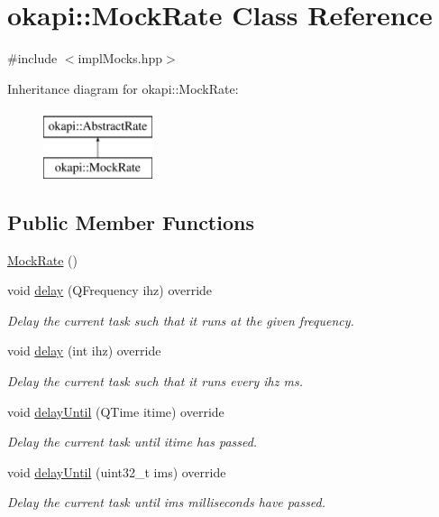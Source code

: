 \hypertarget{classokapi_1_1MockRate}{}\section{okapi\+::Mock\+Rate Class Reference}
\label{classokapi_1_1MockRate}


{\ttfamily \#include $<$impl\+Mocks.\+hpp$>$}

Inheritance diagram for okapi\+::Mock\+Rate\+:\begin{figure}[H]
\begin{center}
\leavevmode
\includegraphics[height=2.000000cm]{classokapi_1_1MockRate}
\end{center}
\end{figure}
\subsection*{Public Member Functions}
\begin{DoxyCompactItemize}
\item 
\mbox{\hyperlink{classokapi_1_1MockRate_a2525b2b5f77a2c03b0eb52349e593e85}{Mock\+Rate}} ()
\item 
void \mbox{\hyperlink{classokapi_1_1MockRate_a250509f0ad94f97f57581396b0053ef5}{delay}} (Q\+Frequency ihz) override
\begin{DoxyCompactList}\small\item\em Delay the current task such that it runs at the given frequency. \end{DoxyCompactList}\item 
void \mbox{\hyperlink{classokapi_1_1MockRate_acd0e61858825a78f84610d50f0a4bc10}{delay}} (int ihz) override
\begin{DoxyCompactList}\small\item\em Delay the current task such that it runs every ihz ms. \end{DoxyCompactList}\item 
void \mbox{\hyperlink{classokapi_1_1MockRate_a561ecf619b53825d78d7ca0d9d95640b}{delay\+Until}} (Q\+Time itime) override
\begin{DoxyCompactList}\small\item\em Delay the current task until itime has passed. \end{DoxyCompactList}\item 
void \mbox{\hyperlink{classokapi_1_1MockRate_a61c3ec4590e3c7305f8882cf1b1d31d0}{delay\+Until}} (uint32\+\_\+t ims) override
\begin{DoxyCompactList}\small\item\em Delay the current task until ims milliseconds have passed. \end{DoxyCompactList}\end{DoxyCompactItemize}


